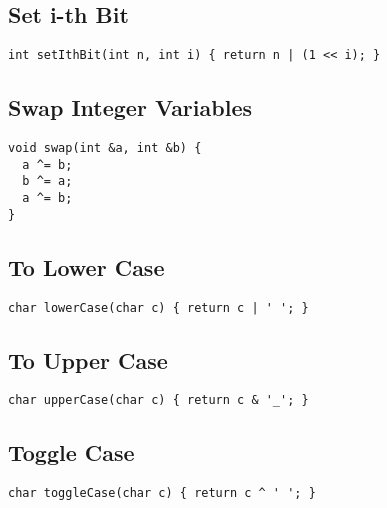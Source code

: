 \documentclass[twoside]{article}
\newcommand{\fileTitleStyle}{\large\underline}
\begin{document}
\begin{multicols*}{2}
\subsection*{Set i-th Bit}
\begin{verbatim}
int setIthBit(int n, int i) { return n | (1 << i); }
\end{verbatim}

\subsectionfont{\centering\bfseries\LARGE}
\subsectionfont{\fileTitleStyle}
\subsection*{Swap Integer Variables}
\begin{verbatim}
void swap(int &a, int &b) {
  a ^= b;
  b ^= a;
  a ^= b;
}
\end{verbatim}

\subsectionfont{\centering\bfseries\LARGE}
\subsectionfont{\fileTitleStyle}
\subsection*{To Lower Case}
\begin{verbatim}
char lowerCase(char c) { return c | ' '; }
\end{verbatim}

\subsectionfont{\centering\bfseries\LARGE}
\subsectionfont{\fileTitleStyle}
\subsection*{To Upper Case}
\begin{verbatim}
char upperCase(char c) { return c & '_'; }
\end{verbatim}

\subsectionfont{\centering\bfseries\LARGE}
\subsectionfont{\fileTitleStyle}
\subsection*{Toggle Case}
\begin{verbatim}
char toggleCase(char c) { return c ^ ' '; }
\end{verbatim}


\end{multicols*}
\end{document}
